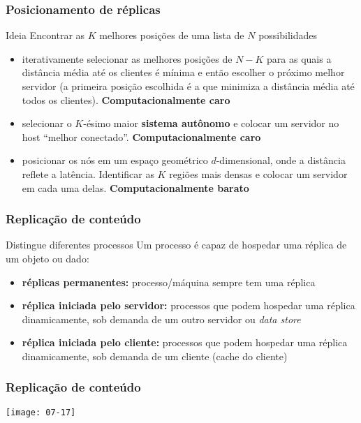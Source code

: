 \documentclass[Ligatures=TeX,table,brazil,svgnames,usetotalslideindicator,compress,10pt]{beamer}
\begin{document}
\begin{frame}
  \frametitle{Posicionamento de réplicas}
  \begin{block}{Ideia}
    Encontrar as $K$ melhores posições de uma lista de $N$ possibilidades
  \end{block}

  \begin{itemize}[<+->]
  \item iterativamente selecionar as melhores posições de $N-K$ para as quais a \alert{distância média até os clientes} é mínima e então escolher o próximo melhor servidor (a primeira posição escolhida é a que minimiza a distância média até todos os clientes). \textbf{Computacionalmente caro}
  \item selecionar o $K$-ésimo maior \textbf{sistema autônomo} e colocar um servidor no host ``melhor conectado''. \textbf{Computacionalmente caro}
  \item posicionar os nós em um espaço geométrico $d$-dimensional, onde a distância reflete a latência. Identificar as $K$ regiões mais densas e colocar um servidor em cada uma delas. \textbf{Computacionalmente barato}
  \end{itemize}

\end{frame}

\begin{frame}
  \frametitle{Replicação de conteúdo}
  \begin{block}{Distingue diferentes processos}
    Um processo é capaz de hospedar uma réplica de um objeto ou dado:
  \end{block}
  \begin{itemize}
  \item \textbf{réplicas permanentes:} processo/máquina sempre tem uma réplica
  \item \textbf{réplica iniciada pelo servidor:} processos que podem  hospedar uma réplica dinamicamente, sob demanda de um outro servidor ou \textit{data store}
  \item \textbf{réplica iniciada pelo cliente:} processos que podem hospedar uma réplica dinamicamente, sob demanda de um cliente (\alert{cache do cliente})
  \end{itemize}
\end{frame}

\begin{frame}
  \frametitle{Replicação de conteúdo}

  \texttt{[image: 07-17]}

\end{frame}
\end{document}
